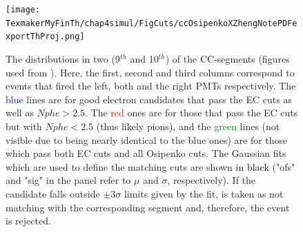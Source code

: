 \begin{figure}[H] %
\centering
\leavevmode \texttt{[image: TexmakerMyFinTh/chap4simul/FigCuts/ccOsipenkoXZhengNotePDFexportThProj.png]}  %
\caption[CC-projected \th distributions]{The \thp distributions %
in two (9$^{th}$ and 10$^{th}$) of the CC-segments (figures used from \cite{anaNoteXZheng}). Here, the first, second and third columns correspond to events that fired the left, both and the right PMTs respectively. The \textcolor{blue}{blue} lines are for good electron candidates that pass the EC cuts as well as $Nphe > 2.5$. The \textcolor{red}{red} ones are for those that pass the EC cuts but with $Nphe < 2.5$ (thus likely pions), and the \textcolor{green}{green} lines (not visible due to being nearly identical to the blue ones) are for those which pass both EC cuts and all Osipenko cuts. The Gaussian fits which are used to define the \th matching cuts are shown in \textcolor{black}{black} ("ofs" and "sig" in the panel refer to $\mu$ and $\sigma$, respectively). If the candidate falls outside $\pm 3 \sigma$ limits given by the fit, \thp is taken as not matching with the corresponding segment and, therefore, the event is rejected.}
\label{ccThProjDist}
\end{figure}
    


